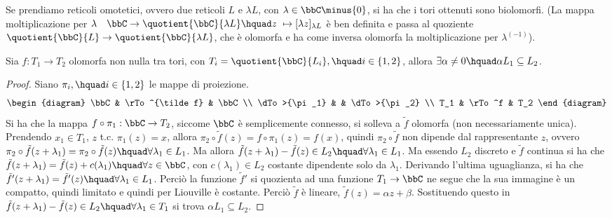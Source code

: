 \begin{osservazione}
Se prendiamo reticoli omotetici, ovvero due reticoli $L$ e $\lambda L$, con $\lambda \in \bbC\minus\{ 0\}$, si ha che i tori ottenuti sono biolomorfi. (La mappa moltiplicazione per $\lambda \quad \bbC \rightarrow \quotient{\bbC}{\lambda L} \hquad z\ \mapsto [\lambda z]_{\lambda L} $ è ben definita e passa al quoziente $\quotient{\bbC}{L}\rightarrow \quotient{\bbC}{\lambda L}$, che è olomorfa e ha come inversa olomorfa la moltiplicazione per $\lambda^{(-1)}$).
\end{osservazione}

\begin{proposizione}Sia $f:T_1\rightarrow T_2$ olomorfa non nulla tra tori, con $T_i=\quotient{\bbC}{L_i},\hquad i\in \{ 1,2\}$, allora $\exists\alpha\neq0 \hquad \alpha L_1\subseteq L_2$.
\end{proposizione}
\begin{proof} Siano $\pi_i,\hquad i\in \{ 1,2\}$ le mappe di proiezione.
    \[
        \begin{diagram}
            \bbC            & \rTo^{\tilde f} 	& \bbC 		 	\\
            \dTo>{\pi_1}	&					& \dTo>{\pi_2}		\\
            T_1   			& \rTo^f 			& T_2
        \end{diagram}
    \]
Si ha che la mappa $f\circ\pi_1: \bbC\rightarrow T_2$, siccome $\bbC$ è semplicemente connesso, si solleva a $\tilde{f}$ olomorfa (non necessariamente unica).
Prendendo $x_1\in T_1$, $z$ t.c. $\pi_1(z)=x$, allora $\pi_2\circ\tilde{f} (z) = f\circ \pi_1 (z)= f(x)$, quindi $\pi_2\circ \tilde{f}$ non dipende dal rappresentante $z$, ovvero $\pi_2\circ \tilde{f} (z+\lambda_1)=\pi_2\circ \tilde{f} (z)\hquad \forall \lambda_1\in L_1$.
Ma allora $\tilde{f} (z+\lambda_1) - \tilde{f} (z) \in L_2 \hquad \forall \lambda_1 \in L_1$.
Ma essendo $L_2$ discreto e $\tilde{f}$ continua si ha che $\tilde{f}(z+\lambda_1)=\tilde{f}(z)+c(\lambda_1)\hquad \forall z\in\bbC$, con $c(\lambda_1)\in L_2$ costante dipendente solo da $\lambda_1$.
Derivando l'ultima uguaglianza, si ha che $\tilde{f}'(z+\lambda_1)=\tilde{f}'(z) \hquad\forall \lambda_1\in L_1$.
Perciò la funzione $\tilde{f}'$ si quozienta ad una funzione  $T_1\rightarrow \bbC$ ne segue che la sua immagine è un compatto, quindi limitato e quindi per Liouville è costante.
Perciò $\tilde{f}$ è lineare, $\tilde{f}(z)=\alpha z+\beta$.
Sostituendo questo in $\tilde{f} (z+\lambda_1) - \tilde{f} (z) \in L_2 \hquad \forall \lambda_1 \in T_1$ si trova $\alpha L_1\subseteq L_2$.
\end{proof}

